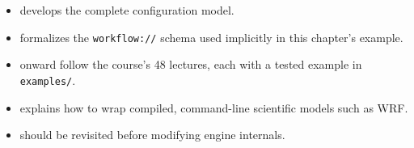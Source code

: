 \begin{itemize}[leftmargin=1.4em]
  \item {} develops the complete configuration model.
  \item {} formalizes the \texttt{workflow://} schema used
    implicitly in this chapter's example.
  \item {} onward follow the course's 48 lectures, each
    with a tested example in \texttt{examples/}.
  \item {} explains how to wrap compiled,
    command-line scientific models such as WRF.
  \item {} should be revisited before modifying engine
    internals.
\end{itemize}
